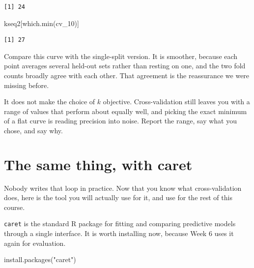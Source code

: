 \documentclass[
  a4paper,
]{scrbook}
\newenvironment{Shaded}{\begin{snugshade}}{\end{snugshade}}
\newcommand{\FunctionTok}[1]{\textcolor[rgb]{0.28,0.35,0.67}{#1}}
\newcommand{\NormalTok}[1]{\textcolor[rgb]{0.00,0.23,0.31}{#1}}
\newcommand{\StringTok}[1]{\textcolor[rgb]{0.13,0.47,0.30}{#1}}
\begin{document}
\begin{verbatim}
[1] 24
\end{verbatim}

\begin{Shaded}
\begin{Highlighting}[]
\NormalTok{kseq2[}\FunctionTok{which.min}\NormalTok{(cv\_10)]}
\end{Highlighting}
\end{Shaded}

\begin{verbatim}
[1] 27
\end{verbatim}

Compare this curve with the single-split version. It is smoother,
because each point averages several held-out sets rather than resting on
one, and the two fold counts broadly agree with each other. That
agreement is the reassurance we were missing before.

It does not make the choice of \(k\) objective. Cross-validation still
leaves you with a range of values that perform about equally well, and
picking the exact minimum of a flat curve is reading precision into
noise. Report the range, say what you chose, and say why.

\section{The same thing, with caret}\label{the-same-thing-with-caret}

Nobody writes that loop in practice. Now that you know what
cross-validation does, here is the tool you will actually use for it,
and use for the rest of this course.

\texttt{caret} is the standard R package for fitting and comparing
predictive models through a single interface. It is worth installing
now, because Week 6 uses it again for evaluation.

\begin{Shaded}
\begin{Highlighting}[]
\FunctionTok{install.packages}\NormalTok{(}\StringTok{"caret"}\NormalTok{)}
\end{Highlighting}
\end{Shaded}
\end{document}
